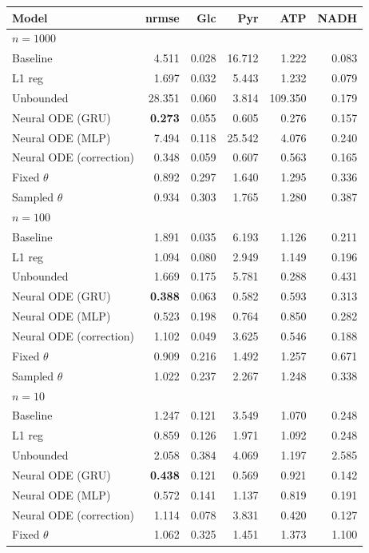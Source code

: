 \begin{tabular}{lrrrrr}
\toprule
Model & nrmse & Glc & Pyr & ATP & NADH \\
\midrule
\multicolumn{6}{l}{\textbf{$n=1000$}} \\
Baseline & 4.511 & 0.028 & 16.712 & 1.222 & 0.083 \\
L1 reg & 1.697 & 0.032 & 5.443 & 1.232 & 0.079 \\
Unbounded & 28.351 & 0.060 & 3.814 & 109.350 & 0.179 \\
Neural ODE (GRU) & \textbf{0.273} & 0.055 & 0.605 & 0.276 & 0.157 \\
Neural ODE (MLP) & 7.494 & 0.118 & 25.542 & 4.076 & 0.240 \\
Neural ODE (correction) & 0.348 & 0.059 & 0.607 & 0.563 & 0.165 \\
Fixed $\theta$ & 0.892 & 0.297 & 1.640 & 1.295 & 0.336 \\
Sampled $\theta$ & 0.934 & 0.303 & 1.765 & 1.280 & 0.387 \\
\midrule
\multicolumn{6}{l}{\textbf{$n=100$}} \\
Baseline & 1.891 & 0.035 & 6.193 & 1.126 & 0.211 \\
L1 reg & 1.094 & 0.080 & 2.949 & 1.149 & 0.196 \\
Unbounded & 1.669 & 0.175 & 5.781 & 0.288 & 0.431 \\
Neural ODE (GRU) & \textbf{0.388} & 0.063 & 0.582 & 0.593 & 0.313 \\
Neural ODE (MLP) & 0.523 & 0.198 & 0.764 & 0.850 & 0.282 \\
Neural ODE (correction) & 1.102 & 0.049 & 3.625 & 0.546 & 0.188 \\
Fixed $\theta$ & 0.909 & 0.216 & 1.492 & 1.257 & 0.671 \\
Sampled $\theta$ & 1.022 & 0.237 & 2.267 & 1.248 & 0.338 \\
\midrule
\multicolumn{6}{l}{\textbf{$n=10$}} \\
Baseline & 1.247 & 0.121 & 3.549 & 1.070 & 0.248 \\
L1 reg & 0.859 & 0.126 & 1.971 & 1.092 & 0.248 \\
Unbounded & 2.058 & 0.384 & 4.069 & 1.197 & 2.585 \\
Neural ODE (GRU) & \textbf{0.438} & 0.121 & 0.569 & 0.921 & 0.142 \\
Neural ODE (MLP) & 0.572 & 0.141 & 1.137 & 0.819 & 0.191 \\
Neural ODE (correction) & 1.114 & 0.078 & 3.831 & 0.420 & 0.127 \\
Fixed $\theta$ & 1.062 & 0.325 & 1.451 & 1.373 & 1.100 \\

\end{tabular}
